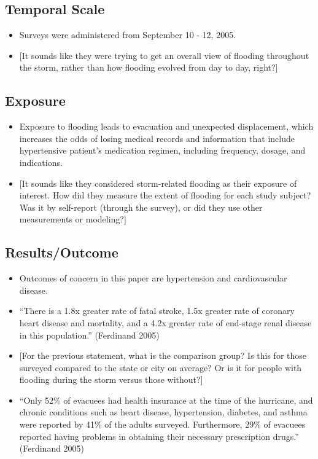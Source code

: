 \documentclass[
]{article}
\providecommand{\tightlist}{%
  \setlength{\itemsep}{0pt}\setlength{\parskip}{0pt}}
\begin{document}
\hypertarget{temporal-scale-15}{%
\subsection{Temporal Scale}\label{temporal-scale-15}}

\begin{itemize}
\tightlist
\item
  Surveys were administered from September 10 - 12, 2005.
\item
  {[}It sounds like they were trying to get an overall view of flooding
  throughout the storm, rather than how flooding evolved from day to
  day, right?{]}
\end{itemize}

\hypertarget{exposure-14}{%
\subsection{Exposure}\label{exposure-14}}

\begin{itemize}
\tightlist
\item
  Exposure to flooding leads to evacuation and unexpected displacement,
  which increases the odds of losing medical records and information
  that include hypertensive patient's medication regimen, including
  frequency, dosage, and indications.
\item
  {[}It sounds like they considered storm-related flooding as their
  exposure of interest. How did they measure the extent of flooding for
  each study subject? Was it by self-report (through the survey), or did
  they use other measurements or modeling?{]}
\end{itemize}

\hypertarget{resultsoutcome-1}{%
\subsection{Results/Outcome}\label{resultsoutcome-1}}

\begin{itemize}
\tightlist
\item
  Outcomes of concern in this paper are hypertension and cardiovascular
  disease.
\item
  ``There is a 1.8x greater rate of fatal stroke, 1.5x greater rate of
  coronary heart disease and mortality, and a 4.2x greater rate of
  end-stage renal disease in this population.'' (Ferdinand 2005)
\item
  {[}For the previous statement, what is the comparison group? Is this
  for those surveyed compared to the state or city on average? Or is it
  for people with flooding during the storm versus those without?{]}
\item
  ``Only 52\% of evacuees had health insurance at the time of the
  hurricane, and chronic conditions such as heart disease, hypertension,
  diabetes, and asthma were reported by 41\% of the adults surveyed.
  Furthermore, 29\% of evacuees reported having problems in obtaining
  their necessary prescription drugs.'' (Ferdinand 2005)
\end{itemize}
\end{document}
